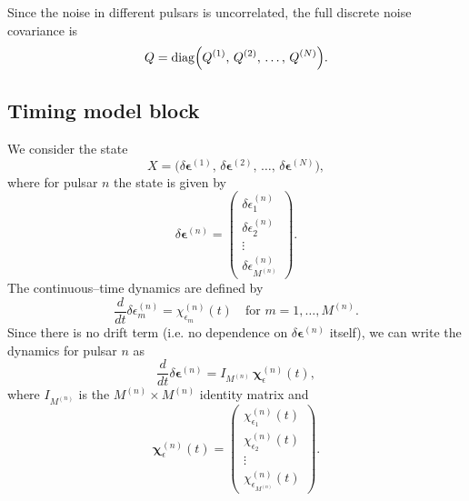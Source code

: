 \documentclass{tufte-handout} %
\begin{document}
Since the noise in different pulsars is uncorrelated, the full discrete noise covariance is
\begin{equation}
Q = \operatorname{diag}\Bigl(Q^{(1)},\,Q^{(2)},\,\ldots,\,Q^{(N)}\Bigr).
\end{equation}


\subsection{Timing model block}


We consider the state
\begin{equation}
X = \bigl(\delta\boldsymbol{\epsilon}^{(1)},\,\delta\boldsymbol{\epsilon}^{(2)},\,\dots,\,\delta\boldsymbol{\epsilon}^{(N)}\bigr),
\end{equation}
where for pulsar \(n\) the state is given by
\begin{equation}
\delta\boldsymbol{\epsilon}^{(n)} = \begin{pmatrix}
\delta\epsilon_1^{(n)} \\
\delta\epsilon_2^{(n)} \\
\vdots \\
\delta\epsilon_{M^{(n)}}^{(n)}
\end{pmatrix}.
\end{equation}
The continuous--time dynamics are defined by
\begin{equation}
\frac{d}{dt}\delta\epsilon_m^{(n)} = \chi_{\epsilon_m}^{(n)}(t) \quad \text{for } m=1,\ldots,M^{(n)}.
\end{equation}
Since there is no drift term (i.e. no dependence on \(\delta\boldsymbol{\epsilon}^{(n)}\) itself), we can write the dynamics for pulsar \(n\) as
\begin{equation}
\frac{d}{dt}\delta\boldsymbol{\epsilon}^{(n)} = I_{M^{(n)}}\,\boldsymbol{\chi}_\epsilon^{(n)}(t),
\end{equation}
where \(I_{M^{(n)}}\) is the \(M^{(n)}\times M^{(n)}\) identity matrix and
\begin{equation}
\boldsymbol{\chi}_\epsilon^{(n)}(t)= \begin{pmatrix}
\chi_{\epsilon_1}^{(n)}(t) \\
\chi_{\epsilon_2}^{(n)}(t) \\
\vdots \\
\chi_{\epsilon_{M^{(n)}}}^{(n)}(t)
\end{pmatrix}.
\end{equation}
\end{document}
